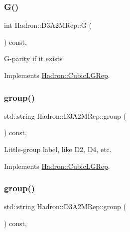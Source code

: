 \subsubsection{\texorpdfstring{G()}{G()}\hspace{0.1cm}{\footnotesize\ttfamily [2/2]}}
{\footnotesize\ttfamily int Hadron\+::\+D3\+A2\+M\+Rep\+::G (\begin{DoxyParamCaption}{ }\end{DoxyParamCaption}) const\hspace{0.3cm}{\ttfamily [inline]}, {\ttfamily [virtual]}}

G-\/parity if it exists 

Implements \mbox{\hyperlink{structHadron_1_1CubicLGRep_ace26f7b2d55e3a668a14cb9026da5231}{Hadron\+::\+Cubic\+L\+G\+Rep}}.

\mbox{\label{structHadron_1_1D3A2MRep_a8f43a2bae307e4f79549d0ca2e15e90d}} 
\subsubsection{\texorpdfstring{group()}{group()}\hspace{0.1cm}{\footnotesize\ttfamily [1/2]}}
{\footnotesize\ttfamily std\+::string Hadron\+::\+D3\+A2\+M\+Rep\+::group (\begin{DoxyParamCaption}{ }\end{DoxyParamCaption}) const\hspace{0.3cm}{\ttfamily [inline]}, {\ttfamily [virtual]}}

Little-\/group label, like D2, D4, etc. 

Implements \mbox{\hyperlink{structHadron_1_1CubicLGRep_a9bdb14b519a611d21379ed96a3a9eb41}{Hadron\+::\+Cubic\+L\+G\+Rep}}.

\mbox{\label{structHadron_1_1D3A2MRep_a8f43a2bae307e4f79549d0ca2e15e90d}} 
\subsubsection{\texorpdfstring{group()}{group()}\hspace{0.1cm}{\footnotesize\ttfamily [2/2]}}
{\footnotesize\ttfamily std\+::string Hadron\+::\+D3\+A2\+M\+Rep\+::group (\begin{DoxyParamCaption}{ }\end{DoxyParamCaption}) const\hspace{0.3cm}{\ttfamily [inline]}, {\ttfamily [virtual]}}

